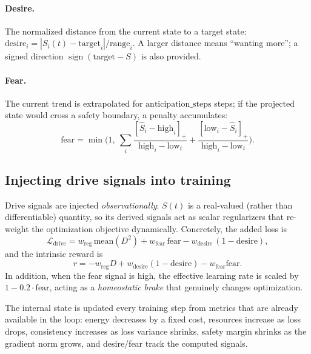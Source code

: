 \documentclass[11pt]{article}
\begin{document}
\paragraph{Desire.} The normalized distance from the current state to a target
state: $\mathrm{desire}_i=|S_i(t)-\mathrm{target}_i|/\mathrm{range}_i$. A larger
distance means ``wanting more''; a signed direction
$\operatorname{sign}(\mathrm{target}-S)$ is also provided.

\paragraph{Fear.} The current trend is extrapolated for
$\mathrm{anticipation\_steps}$ steps; if the projected state would cross a
safety boundary, a penalty accumulates:
\begin{equation}
  \mathrm{fear} = \min\Big(1,\ \sum_i \frac{[\hat S_i - \mathrm{high}_i]_+}
  {\mathrm{high}_i-\mathrm{low}_i} + \frac{[\mathrm{low}_i - \hat S_i]_+}
  {\mathrm{high}_i-\mathrm{low}_i}\Big).
\end{equation}

\subsection{Injecting drive signals into training}
Drive signals are injected \emph{observationally}: $S(t)$ is a real-valued
(rather than differentiable) quantity, so its derived signals act as scalar
regularizers that re-weight the optimization objective dynamically. Concretely,
the added loss is
\begin{equation}
  \mathcal{L}_{\mathrm{drive}} =
  w_{\mathrm{reg}}\,\mathrm{mean}(D^2)
  + w_{\mathrm{fear}}\,\mathrm{fear}
  - w_{\mathrm{desire}}\,(1-\mathrm{desire}),
\label{eq:driveloss}
\end{equation}
and the intrinsic reward is
\begin{equation}
  r = -w_{\mathrm{reg}}D + w_{\mathrm{desire}}(1-\mathrm{desire})
      - w_{\mathrm{fear}}\mathrm{fear}.
\label{eq:reward}
\end{equation}
In addition, when the fear signal is high, the effective learning rate is scaled
by $1-0.2\cdot\mathrm{fear}$, acting as a \emph{homeostatic brake} that
genuinely changes optimization.

The internal state is updated every training step from metrics that are already
available in the loop: energy decreases by a fixed cost, resources increase as
loss drops, consistency increases as loss variance shrinks, safety margin shrinks
as the gradient norm grows, and desire/fear track the computed signals.
\end{document}
